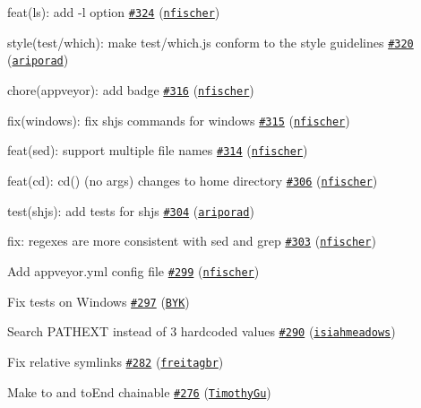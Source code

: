 \begin{DoxyItemize}
\item feat(ls)\+: add -\/l option \href{https://github.com/shelljs/shelljs/pull/324}{\tt \#324} (\href{https://github.com/nfischer}{\tt nfischer})
\item style(test/which)\+: make test/which.\+js conform to the style guidelines \href{https://github.com/shelljs/shelljs/pull/320}{\tt \#320} (\href{https://github.com/ariporad}{\tt ariporad})
\item chore(appveyor)\+: add badge \href{https://github.com/shelljs/shelljs/pull/316}{\tt \#316} (\href{https://github.com/nfischer}{\tt nfischer})
\item fix(windows)\+: fix shjs commands for windows \href{https://github.com/shelljs/shelljs/pull/315}{\tt \#315} (\href{https://github.com/nfischer}{\tt nfischer})
\item feat(sed)\+: support multiple file names \href{https://github.com/shelljs/shelljs/pull/314}{\tt \#314} (\href{https://github.com/nfischer}{\tt nfischer})
\item feat(cd)\+: cd() (no args) changes to home directory \href{https://github.com/shelljs/shelljs/pull/306}{\tt \#306} (\href{https://github.com/nfischer}{\tt nfischer})
\item test(shjs)\+: add tests for shjs \href{https://github.com/shelljs/shelljs/pull/304}{\tt \#304} (\href{https://github.com/ariporad}{\tt ariporad})
\item fix\+: regexes are more consistent with sed and grep \href{https://github.com/shelljs/shelljs/pull/303}{\tt \#303} (\href{https://github.com/nfischer}{\tt nfischer})
\item Add appveyor.\+yml config file \href{https://github.com/shelljs/shelljs/pull/299}{\tt \#299} (\href{https://github.com/nfischer}{\tt nfischer})
\item Fix tests on Windows \href{https://github.com/shelljs/shelljs/pull/297}{\tt \#297} (\href{https://github.com/BYK}{\tt B\+YK})
\item Search P\+A\+T\+H\+E\+XT instead of 3 hardcoded values \href{https://github.com/shelljs/shelljs/pull/290}{\tt \#290} (\href{https://github.com/isiahmeadows}{\tt isiahmeadows})
\item Fix relative symlinks \href{https://github.com/shelljs/shelljs/pull/282}{\tt \#282} (\href{https://github.com/freitagbr}{\tt freitagbr})
\item Make to and to\+End chainable \href{https://github.com/shelljs/shelljs/pull/276}{\tt \#276} (\href{https://github.com/TimothyGu}{\tt Timothy\+Gu})
\end{DoxyItemize}

